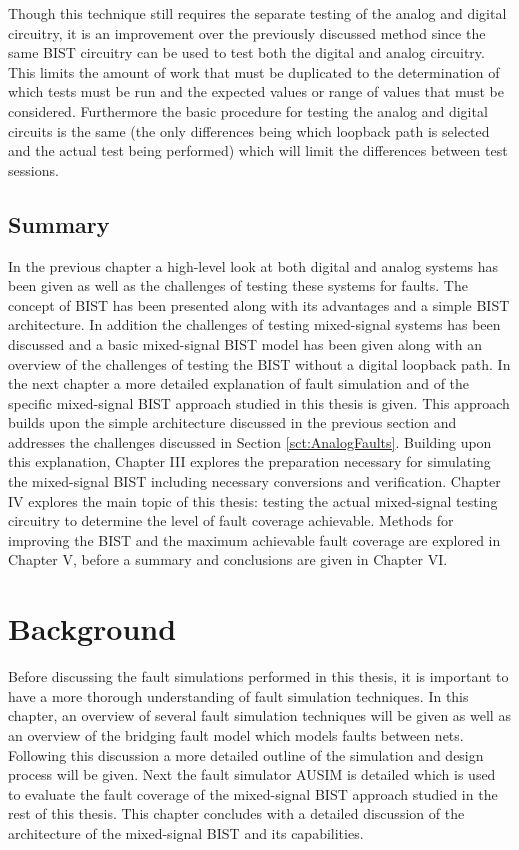 \documentclass[12pt]{report}
\begin{document}
Though this technique still requires the separate testing of the analog and digital circuitry, it is an improvement over the previously discussed method since the same BIST circuitry can be used to test both the digital and analog circuitry\cite{stroud}.  This limits the amount of work that must be duplicated to the determination of which tests must be run and the expected values or range of values that must be considered.  Furthermore the basic procedure for testing the analog and digital circuits is the same (the only differences being which loopback path is selected and the actual test being performed) which will limit the differences between test sessions.

\section{Summary}
In the previous chapter a high-level look at both digital and analog systems has been given as well as the challenges of testing these systems for faults.  The concept of BIST has been presented along with its advantages and a simple BIST architecture.  In addition the challenges of testing mixed-signal systems has been discussed and a basic mixed-signal BIST model has been given along with an overview of the challenges of testing the BIST without a digital loopback path.  In the next chapter a more detailed explanation of fault simulation and of the specific mixed-signal BIST approach studied in this thesis is given.  This approach builds upon the simple architecture discussed in the previous section and addresses the challenges discussed in Section \ref{sct:AnalogFaults}.  Building upon this explanation, Chapter III explores the preparation necessary for simulating the mixed-signal BIST including necessary conversions and verification.  Chapter IV explores the main topic of this thesis: testing the actual mixed-signal testing circuitry to determine the level of fault coverage achievable.  Methods for improving the BIST and the maximum achievable fault coverage are explored in Chapter V, before a summary and conclusions are given in Chapter VI.

\chapter{Background}
Before discussing the fault simulations performed in this thesis, it is important to have a more thorough understanding of fault simulation techniques.  In this chapter, an overview of several fault simulation techniques will be given as well as an overview of the bridging fault model which models faults between nets.  Following this discussion a more detailed outline of the simulation and design process will be given.  Next the fault simulator AUSIM is detailed which is used to evaluate the fault coverage of the mixed-signal BIST approach studied in the rest of this thesis.  This chapter concludes with a detailed discussion of the architecture of the mixed-signal BIST and its capabilities.
\end{document}
